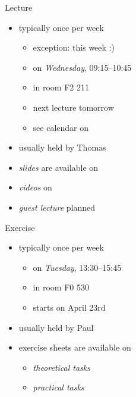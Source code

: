 \begin{frame}{\myframetitle}
	\myframeicon{\fancyqr[image={\pic[width=10mm]{moodle-calendar}}]{}} %
	\begin{mycolumns}
		\begin{definition}{Lecture}
			\begin{itemize}
				\item typically once per week
				\begin{itemize}
					\item exception: this week :)
					\item on \emph{Wednesday}, 09:15--10:45
					\item in room F2 211
					\item next lecture tomorrow
					\item see calendar on \Panda
				\end{itemize}
				\item usually held by Thomas
				\item \emph{slides} are available on \Panda
				\item \emph{videos} on \Youtube
				\item \emph{guest lecture} planned
			\end{itemize}
		\end{definition}
	\mynextcolumn
		\begin{example}{Exercise}
			\begin{itemize}
				\item typically once per week
				\begin{itemize}
					\item on \emph{Tuesday}, 13:30--15:45
					\item in room F0 530
					\item starts on April 23rd
				\end{itemize}
				\item usually held by Paul
				\item exercise sheets are available on \Panda
				\begin{itemize}
					\item \emph{theoretical tasks}
					\item \emph{practical tasks}
				\end{itemize}
			\end{itemize}
		\end{example}
	\end{mycolumns}
\end{frame}


